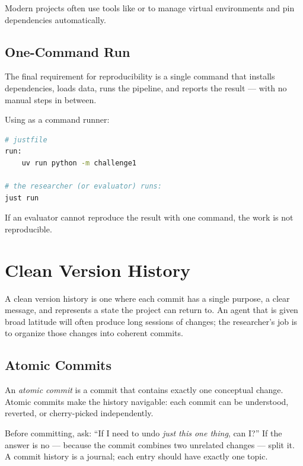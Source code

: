 Modern projects often use tools like  or  to manage virtual environments and pin dependencies automatically.

\subsection{One-Command Run}

The final requirement for reproducibility is a single command that installs dependencies, loads data, runs the pipeline, and reports the result — with no manual steps in between.

\begin{example}
Using  as a command runner:
\begin{lstlisting}[language=bash]
# justfile
run:
    uv run python -m challenge1

# the researcher (or evaluator) runs:
just run
\end{lstlisting}
If an evaluator cannot reproduce the result with one command, the work is not reproducible.
\end{example}

\section{Clean Version History}

A clean version history is one where each commit has a single purpose, a clear message, and represents a state the project can return to.
An agent that is given broad latitude will often produce long sessions of changes; the researcher's job is to organize those changes into coherent commits.

\subsection{Atomic Commits}

An \emph{atomic commit} is a commit that contains exactly one conceptual change.
Atomic commits make the history navigable: each commit can be understood, reverted, or cherry-picked independently.

\begin{principle}
\label{principle:AtomicCommits}
Before committing, ask: ``If I need to undo \emph{just this one thing}, can I?''
If the answer is no — because the commit combines two unrelated changes — split it.
A commit history is a journal; each entry should have exactly one topic.
\end{principle}

